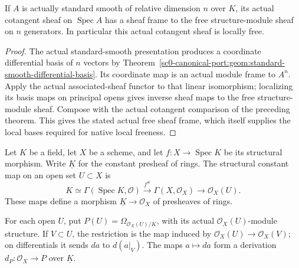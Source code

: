 \begin{theorem}
\label{sc0-canonical-port:geom:standard-smooth-actual-cotangent-sheaf-frame}
\leanok
If \(A\) is actually standard smooth of relative
dimension \(n\) over \(K\), its actual cotangent
sheaf on \(\operatorname{Spec}A\) has a sheaf frame
to the free structure-module sheaf on \(n\) generators.
In particular this actual cotangent sheaf is locally free.
\end{theorem}
\begin{proof}
The actual standard-smooth presentation produces a
coordinate differential basis of \(n\) vectors by
Theorem~\ref{sc0-canonical-port:geom:standard-smooth-differential-basis}.
Its coordinate map is an actual module frame to \(A^n\).
Apply the actual associated-sheaf functor to that
linear isomorphism; localizing its basis maps on
principal opens gives inverse sheaf maps to the free
structure-module sheaf. Compose with the actual
cotangent comparison of the preceding theorem.
This gives the stated actual free sheaf frame, which
itself supplies the local bases required for native
local freeness.
\end{proof}

\begin{definition}
\label{sc0-canonical-port:geom:structural-constant-presheaf}
\leanok
Let \(K\) be a field, let \(X\) be a scheme, and let
\(f:X\to\operatorname{Spec}K\) be its structural morphism.
Write \(\underline K\) for the constant presheaf of rings.
The structural constant map on an open set \(U\subset X\) is
\[
 K\simeq\Gamma(\operatorname{Spec}K,\mathcal O)
 \xrightarrow{f^\#}\Gamma(X,\mathcal O_X)
 \longrightarrow\mathcal O_X(U).
\]
These maps define a morphism \(\underline K\to\mathcal O_X\)
of presheaves of rings.
\end{definition}

\begin{definition}
\label{sc0-canonical-port:geom:cotangent-presheaf}
\leanok
For each open \(U\), put
\(P(U)=\Omega_{\mathcal O_X(U)/K}\), with its actual
\(\mathcal O_X(U)\)-module structure. If \(V\subset U\), the
restriction is the map induced by \(\mathcal O_X(U)\to\mathcal
O_X(V)\); on differentials it sends \(da\) to
\(d(a|_V)\). The maps \(a\mapsto da\) form a derivation
\(d_P:\mathcal O_X\to P\) over \(\underline K\).
\end{definition}

